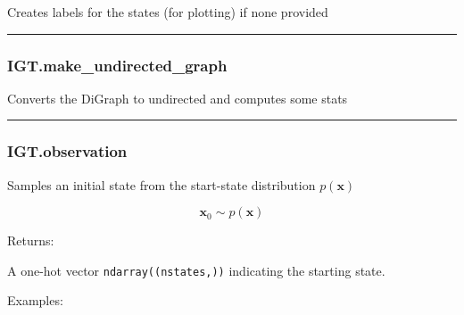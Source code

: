 \begin{Shaded}
\begin{Highlighting}[]
\NormalTok{)}
\end{Highlighting}
\end{Shaded}

Creates labels for the states (for plotting) if none provided

\begin{center}\rule{0.5\linewidth}{\linethickness}\end{center}

\subsubsection{IGT.make\_undirected\_graph}\label{igt.make_undirected_graph}

\begin{Shaded}
\begin{Highlighting}[]
\NormalTok{)}
\end{Highlighting}
\end{Shaded}

Converts the DiGraph to undirected and computes some stats

\begin{center}\rule{0.5\linewidth}{\linethickness}\end{center}

\subsubsection{IGT.observation}\label{igt.observation}

\begin{Shaded}
\begin{Highlighting}[]
\NormalTok{)}
\end{Highlighting}
\end{Shaded}

Samples an initial state from the start-state distribution
\(p(\mathbf x)\)

\[
\mathbf x_0 \sim p(\mathbf x)
\]

Returns:

A one-hot vector \texttt{ndarray((nstates,))} indicating the starting
state.

Examples:

\begin{Shaded}
\begin{Highlighting}[]
\OperatorTok{=}
\end{Highlighting}
\end{Shaded}

